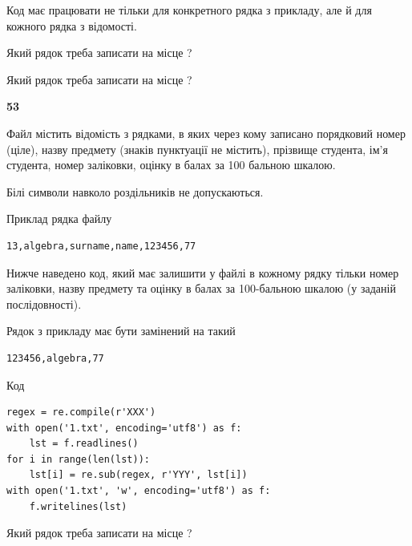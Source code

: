 Код має працювати не тільки для конкретного рядка з прикладу, але й для кожного рядка з відомості.




Який рядок треба записати на місце  ?\par
\vspace{5mm}


Який рядок треба записати на місце  ?\par


\newpage

{\begin {center}\textbf{ 53}\end {center}}\par
Файл  містить відомість з рядками, в яких через кому записа\-но поряд\-ковий номер (ціле), назву предмету (знаків пунктуації не містить), прізвище студента, ім'я студента, номер заліковки, оцінку в балах за 100 бальною шкалою.

Білі символи навколо роздільників не допускаються.

Приклад рядка файлу



\begin{verbatim}
13,algebra,surname,name,123456,77
\end{verbatim}


Нижче наведено код, який має залишити у файлі в кожному рядку тільки номер заліковки, назву предмету та оцінку в балах за 100-бальною шкалою (у заданій послі\-дов\-ності).

Рядок з прикладу має бути замінений на такий



\begin{verbatim}
123456,algebra,77
\end{verbatim}




Код



\begin{verbatim}
regex = re.compile(r'XXX')
with open('1.txt', encoding='utf8') as f:
    lst = f.readlines()
for i in range(len(lst)):
    lst[i] = re.sub(regex, r'YYY', lst[i])
with open('1.txt', 'w', encoding='utf8') as f:
    f.writelines(lst)
\end{verbatim}







Який рядок треба записати на місце  ?\par
\vspace{5mm}


